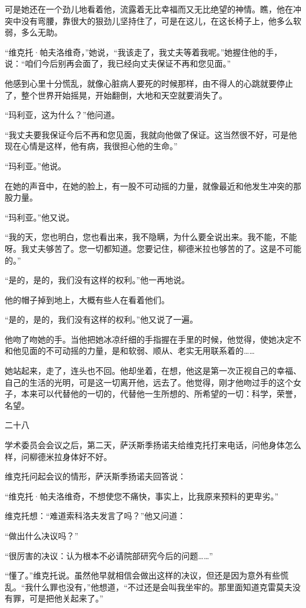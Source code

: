 可是她还在一个劲儿地看着他，流露着无比幸福而又无比绝望的神情。瞧，他在冲突中没有弯腰，靠很大的狠劲儿坚持住了，可是在这儿，在这长椅子上，他多么软弱，多么无助。

“维克托·帕夫洛维奇，”她说，“我该走了，我丈夫等着我呢。”她握住他的手，说：“咱们今后别再会面了，我已经向丈夫保证不再和您见面。”

他感到心里十分慌乱，就像心脏病人要死的时候那样，由不得人的心跳就要停止了，整个世界开始摇晃，开始翻倒，大地和天空就要消失了。

“玛利亚，这为什么？”他问道。

“我丈夫要我保证今后不再和您见面，我就向他做了保证。这当然很不好，可是他现在心情是这样，他有病，我很担心他的生命。”

“玛利亚。”他说。

在她的声音中，在她的脸上，有一股不可动摇的力量，就像最近和他发生冲突的那股力量。

“玛利亚。”他又说。

“我的天，您也明白，您也看出来，我不隐瞒，为什么要全说出来。我不能，不能呀。我丈夫够苦了。您一切都知道。您要记住，柳德米拉也够苦的了。这是不可能的。”

“是的，是的，我们没有这样的权利。”他一再地说。

他的帽子掉到地上，大概有些人在看着他们。

“是的，是的，我们没有这样的权利。”他又说了一遍。

他吻了吻她的手。当他把她冰凉纤细的手指握在手里的时候，他觉得，使她决定不和他见面的不可动摇的力量，是和软弱、顺从、老实无用联系着的……

她站起来，走了，连头也不回。他却坐着，在想，他这是第一次正视自己的幸福、自己的生活的光明，可是这一切离开他，远去了。他觉得，刚才他吻过手的这个女子，本来可以代替他的一切的，代替他一生所想的、所希望的一切：科学，荣誉，名望。

二十八

学术委员会会议之后，第二天，萨沃斯季扬诺夫给维克托打来电话，问他身体怎么样，问柳德米拉身体好不好。

维克托问起会议的情形，萨沃斯季扬诺夫回答说：

“维克托·帕夫洛维奇，不想使您不痛快，事实上，比我原来预料的更卑劣。”

维克托想：“难道索科洛夫发言了吗？”他又问道：

“做出什么决议吗？”

“很厉害的决议：认为根本不必请院部研究今后的问题……”

“懂了。”维克托说。虽然他早就相信会做出这样的决议，但还是因为意外有些慌乱。“我什么罪也没有，”他想道，“不过还是会叫我坐牢的。那里面知道克雷莫夫没有罪，可是把他关起来了。”

